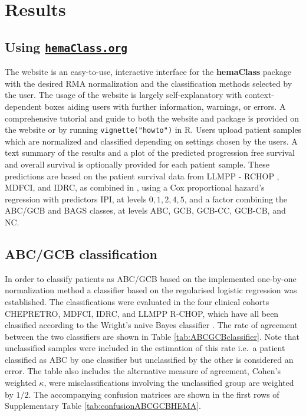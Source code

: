 \documentclass[10pt,letterpaper]{article}
\newcommand{\hemaClass}{\href{http://hemaClass.org}{\texttt{hemaClass.org}}}
\newcommand{\R}{\textsf{R}}
\newcommand{\pkg}[1]{\textbf{#1}}
\begin{document}
\section*{Results}
\subsection*{Using \hemaClass{}}
The website is an easy-to-use, interactive interface for the \pkg{hemaClass} package with the desired RMA normalization and the classification methods selected by the user.
The usage of the website is largely self-explanatory with context-dependent boxes aiding users with further information, warnings, or errors.
A comprehensive tutorial and guide to both the website and package is provided on the website or by running \texttt{vignette("howto")} in \R{}.
Users upload patient samples which are normalized and classified depending on settings chosen by the users.
A text summary of the results and a plot of the predicted progression free survival and overall survival is optionally provided for each patient sample.
These predictions are based on the patient survival data from LLMPP - RCHOP , MDFCI, and IDRC, as combined in \cite{DybkaerBoegsted2015}, using a Cox proportional hazard's regression with predictors IPI, at levels $0,1,2,4,5$, and a factor combining the ABC/GCB and BAGS classes, at levels ABC, GCB, GCB-CC, GCB-CB, and NC.



\subsection*{ABC/GCB classification}
In order to classify patients as ABC/GCB based on the implemented one-by-one normalization method a classifier based on the regularised logistic regression was established.
The classifications were evaluated in the four clinical cohorts CHEPRETRO, MDFCI, IDRC, and LLMPP R-CHOP, which have all been classified according to the Wright's naive Bayes classifier \cite{Wright2003,Lenz2008a}.
The rate of agreement between the two classifiers are shown in Table \ref{tab:ABCGCBclassifier}.
Note that unclassified samples were included in the estimation of this rate i.e.\ a patient classified as ABC by one classifier but unclassified by the other is considered an error.
The table also includes the alternative measure of agreement, Cohen's weighted $\kappa$, were misclassifications involving the unclassified group are weighted by $1/2$.
The accompanying confusion matrices are shown in the first rows of Supplementary Table \ref{tab:confusionABCGCBHEMA}.
\end{document}
